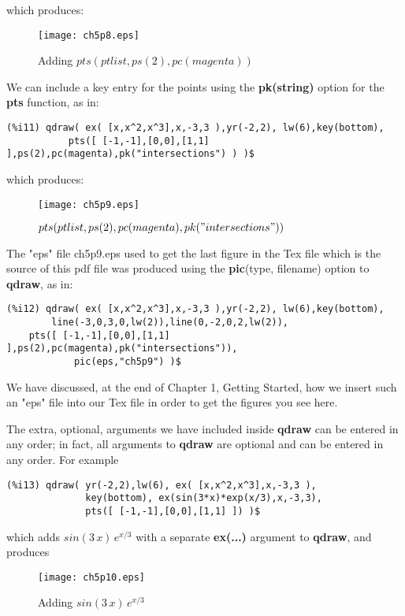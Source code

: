 \documentclass[12pt]{article}
\begin{document}
\smallskip
which produces:
\begin{figure} [h]
   \centerline{\texttt{[image: ch5p8.eps]} }
	\caption{ Adding $pts(ptlist,ps(2),pc(magenta) )$ }
\end{figure}    
 
\smallskip
We can include a key entry for the points using the \textbf{pk(string)} option
  for the \textbf{pts} function, as in:
\small
\begin{verbatim}
(%i11) qdraw( ex( [x,x^2,x^3],x,-3,3 ),yr(-2,2), lw(6),key(bottom), 
           pts([ [-1,-1],[0,0],[1,1] ],ps(2),pc(magenta),pk("intersections") ) )$
\end{verbatim}
\normalsize
which produces:
\begin{figure} [h]
   \centerline{\texttt{[image: ch5p9.eps]} }
	\caption{ $pts(ptlist,ps(2),pc(magenta),pk("intersections") )$ }
\end{figure}      
\newpage
The "eps" file ch5p9.eps used to get the last figure in the Tex file
  which is the source of this pdf file was produced using the \textbf{pic}(type, filename)
  option to \textbf{qdraw}, as in:
\small
\begin{verbatim}
(%i12) qdraw( ex( [x,x^2,x^3],x,-3,3 ),yr(-2,2), lw(6),key(bottom), 
        line(-3,0,3,0,lw(2)),line(0,-2,0,2,lw(2)),
    pts([ [-1,-1],[0,0],[1,1] ],ps(2),pc(magenta),pk("intersections")),
            pic(eps,"ch5p9") )$
\end{verbatim}
\normalsize
We have discussed, at the end of Chapter 1, Getting Started, how we insert such
  an "eps" file into our Tex file in order to get the figures you see here.  

\smallskip
The extra, optional, arguments we have included inside \textbf{qdraw} can be
  entered in any order; in fact, all arguments to \textbf{qdraw} are optional
  and can be entered in any order.
For example
\small
\begin{verbatim}
(%i13) qdraw( yr(-2,2),lw(6), ex( [x,x^2,x^3],x,-3,3 ),
              key(bottom), ex(sin(3*x)*exp(x/3),x,-3,3),
              pts([ [-1,-1],[0,0],[1,1] ]) )$
\end{verbatim}
\normalsize
which adds $sin(3\,x)\, e^{x/3}$ with a separate \textbf{ex(...)} argument to
  \textbf{qdraw}, and produces

\begin{figure} [h]
   \centerline{\texttt{[image: ch5p10.eps]} }
	\caption{ Adding $sin(3\,x)\, e^{x/3}$  }
\end{figure}        
  
\end{document}
